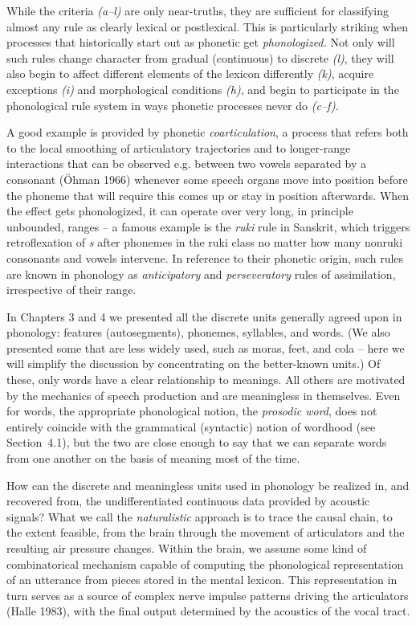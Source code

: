 \bigskip
\noindent
While the criteria {\it (a--l)} are only near-truths, they are sufficient for
classifying almost any rule as clearly lexical or postlexical. This is
particularly striking when processes that historically start out as phonetic
get {\it phonologized.} Not only will such rules change character from gradual
(continuous) to discrete {\it (l)}, they will also begin to affect different
elements of the lexicon differently {\it (k)}, acquire exceptions {\it (i)}
and morphological conditions {\it (h)}, and begin to participate in the
phonological rule system in ways phonetic processes never do {\it (c--f)}.

 A good example is provided by phonetic {\it
  coarticulation}, a process that refers both to the local smoothing of
articulatory trajectories and to longer-range interactions that can be
observed e.g. between two vowels separated by a consonant (\"{O}hman
1966)\nocite{Ohman:1966} whenever some speech organs move into position before
the phoneme that will require this comes up or stay in position
afterwards. When the effect gets phonologized, it can operate over very long,
in principle unbounded, ranges -- a famous example is the {\it ruki} rule in
Sanskrit, which triggers retroflexation of {\it s} after
phonemes in the ruki class no matter how many nonruki consonants and vowels
intervene. In reference to their phonetic origin, such rules are
known in phonology as {\it anticipatory} and {\it perseveratory} rules of
assimilation, irrespective of their range.

In Chapters 3 and 4 we presented all the discrete units generally agreed upon
in phonology: features (autosegments), phonemes, syllables, and words. (We
also presented some that are less widely used, such as moras, feet, and cola --
here we will simplify the discussion by concentrating on the better-known
units.)  Of these, only words have a clear relationship to meanings. All
others are motivated by the mechanics of speech production and are meaningless
in themselves. Even for words, the appropriate phonological notion, the {\it
  prosodic word}, does not entirely coincide with the
grammatical (syntactic) notion of wordhood (see Section~4.1), but the two are
close enough to say that we can separate words from one another on the basis
of meaning most of the time.

How can the discrete and meaningless units used in phonology be realized in,
and recovered from, the undifferentiated continuous data provided by acoustic
signals? What we call the {\it naturalistic} approach is to trace the causal
chain, to the extent feasible, from the brain through the movement of
articulators and the resulting air pressure changes. Within the brain, we
assume some kind of combinatorical mechanism capable of computing the
phonological representation of an utterance from pieces stored in the mental
lexicon. This representation in turn serves as a source of complex nerve
impulse patterns driving the articulators (Halle 1983),\nocite{Halle:1983a}
with the final output determined by the acoustics of the vocal tract.

